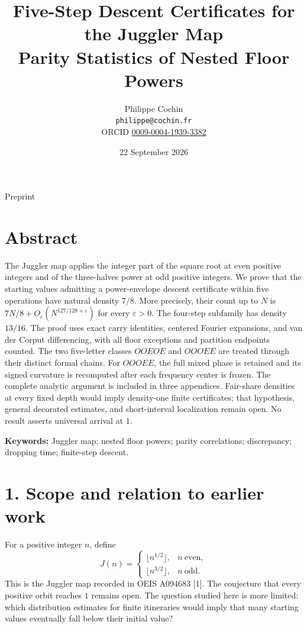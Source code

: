 \documentclass[11pt,a4paper]{article}
\title{Five-Step Descent Certificates for the Juggler
Map\\[0.4em]{\large Parity Statistics of Nested Floor Powers}}
\author{Philippe Cochin\\\small\texttt{philippe@cochin.fr}\\
  \small ORCID \href{https://orcid.org/0009-0004-1939-3382}{0009-0004-1939-3382}}
\date{22 September 2026}
\begin{document}
\maketitle
\begin{center}\small Preprint\end{center}
\section{Abstract}\label{abstract}

The Juggler map applies the integer part of the square root at even
positive integers and of the three-halves power at odd positive
integers. We prove that the starting values admitting a power-envelope
descent certificate within five operations have natural density \(7/8\).
More precisely, their count up to \(N\) is
\(7N/8+O_\varepsilon(N^{127/128+\varepsilon})\) for every
\(\varepsilon>0\). The four-step subfamily has density \(13/16\). The
proof uses exact carry identities, centered Fourier expansions, and van
der Corput differencing, with all floor exceptions and partition
endpoints counted. The two five-letter classes \(OOEOE\) and \(OOOEE\)
are treated through their distinct formal chains. For \(OOOEE\), the
full mixed phase is retained and its signed curvature is recomputed
after each frequency center is frozen. The complete analytic argument is
included in three appendices. Fair-share densities at every fixed depth
would imply density-one finite certificates; that hypothesis, general
decorated estimates, and short-interval localization remain open. No
result asserts universal arrival at \(1\).

\textbf{Keywords:} Juggler map; nested floor powers; parity
correlations; discrepancy; dropping time; finite-step descent.

\section{1. Scope and relation to earlier
work}\label{scope-and-relation-to-earlier-work}

For a positive integer \(n\), define \[
J(n)=
\begin{cases}
\lfloor n^{1/2}\rfloor,&n\ \text{even},\\
\lfloor n^{3/2}\rfloor,&n\ \text{odd}.
\end{cases}
\] This is the Juggler map recorded in OEIS A094683 {[}1{]}. The
conjecture that every positive orbit reaches \(1\) remains open. The
question studied here is more limited: which distribution estimates for
finite itineraries would imply that many starting values eventually fall
below their initial value?
\end{document}
